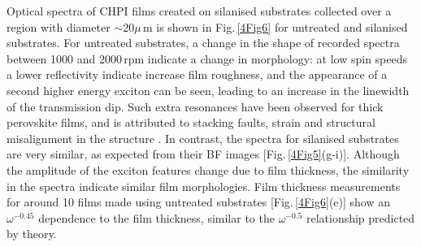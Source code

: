 Optical spectra of CHPI films created on silanised substrates collected over a region with diameter $\sim20\mu$\,m is shown in Fig.\,\ref{4Fig6} for untreated and silanised substrates. For untreated substrates, a change in the shape of recorded spectra between 1000 and 2000\,rpm indicate a change in morphology: at low spin speeds a lower reflectivity indicate increase film roughness, and the appearance of a second higher energy exciton can be seen, leading to an increase in the linewidth of the transmission dip. Such extra resonances have been observed for thick perovskite films, and is attributed to stacking faults, strain and structural misalignment in the structure \cite{VijayaPrakash2009}. In contrast, the spectra for silanised substrates are very similar, as expected from their BF images [Fig.\,\ref{4Fig5}(g-i)]. Although the amplitude of the exciton features change due to film thickness, the similarity in the spectra indicate similar film morphologies. Film thickness measurements for around 10 films made using untreated substrates [Fig.\,\ref{4Fig6}(e)] show an $\omega^{-0.45}$ dependence to the film thickness, similar to the $\omega^{-0.5}$ relationship predicted by theory. 

